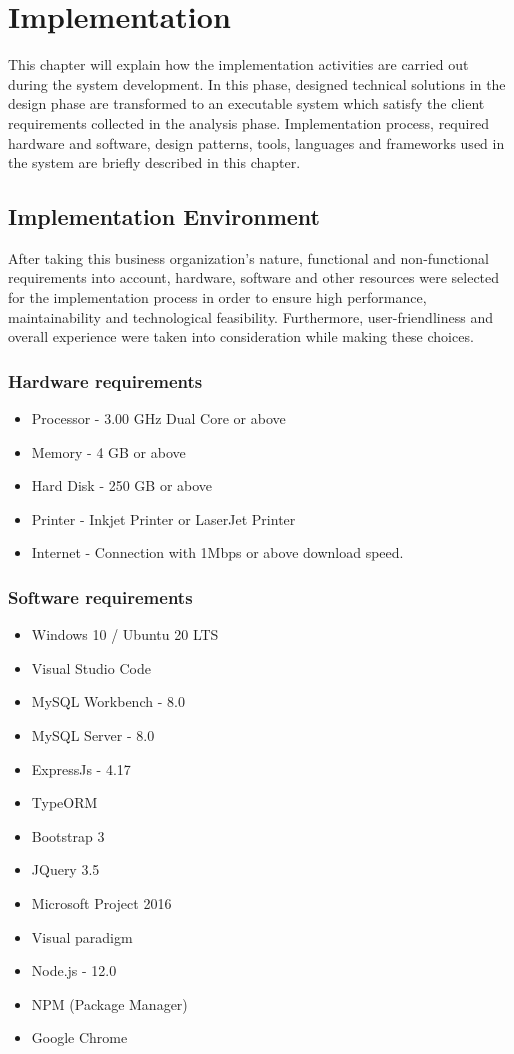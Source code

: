 \documentclass[12pt]{report}
\begin{document}
\newpage
\chapter{Implementation}
This chapter will explain how the implementation activities are carried out during the system development. In this phase, designed technical solutions in the design phase are transformed to an executable system which satisfy the client requirements collected in the analysis phase. Implementation process,   required hardware and software, design patterns, tools, languages and frameworks used in the system are briefly described in this chapter.

\section{Implementation Environment}
After taking this business organization's nature, functional and non-functional requirements into account, hardware, software and other resources were selected for the implementation process in order to ensure high performance, maintainability and technological feasibility. Furthermore, user-friendliness and overall experience were taken into consideration while making these choices.

\subsection{Hardware requirements}
\begin{itemize}
	\item Processor - 3.00 GHz Dual Core or above
	\item Memory - 4 GB or above
	\item Hard Disk - 250 GB or above
	\item Printer - Inkjet Printer or LaserJet Printer
	\item Internet - Connection with 1Mbps or above download speed.
\end{itemize}

\subsection{Software requirements}
\begin{itemize}
	\item Windows 10 / Ubuntu 20 LTS
	\item Visual Studio Code
	\item MySQL Workbench - 8.0
	\item MySQL Server - 8.0
	\item ExpressJs - 4.17
	\item TypeORM
	\item Bootstrap 3
	\item JQuery 3.5
	\item Microsoft Project 2016
	\item Visual paradigm
	\item Node.js - 12.0
	\item NPM (Package Manager)
	\item Google Chrome
\end{itemize}
\end{document}
